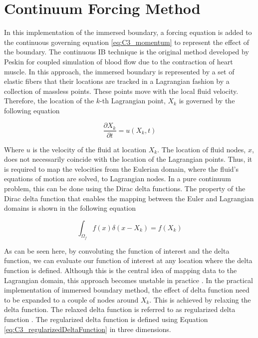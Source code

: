 \section{Continuum Forcing Method}
In this implementation of the immersed boundary, a forcing equation is added to the continuous governing equation \eqref{eq:C3_momentum} to represent the effect of the boundary. The continuous IB technique is the original method developed by Peskin \cite{peskin1972flow} for coupled simulation of blood flow due to the contraction of heart muscle. In this approach, the immersed boundary is represented by a set of elastic fibers that their locations are tracked in a Lagrangian fashion by a collection of massless points. These points move with the local fluid velocity. Therefore, the location of the $k$-th Lagrangian point, $X_k$ is governed by the following equation

\begin{equation}
    \frac{\partial X_k}{\partial t} = u(X_k, t)
\end{equation}

Where $u$ is the velocity of the fluid at location $X_k$. The location of fluid nodes, $x$, does not necessarily coincide with the location of the Lagrangian points. Thus, it is required to map the velocities from the Eulerian domain, where the fluid's equations of motion are solved, to Lagrangian nodes. In a pure continuum problem, this can be done using the Dirac delta functions. The property of the Dirac delta function that enables the mapping between the Euler and Lagrangian domains is shown in the following equation

\begin{equation}
    \int_{\Omega_f} f(x) \delta(x - X_k) = f(X_k)
\end{equation}

As can be seen here, by convoluting the function of interest and the delta function, we can evaluate our function of interest at any location where the delta function is defined. Although this is the central idea of mapping data to the Lagrangian domain, this approach becomes unstable in practice \cite{lee2003stability}. In the practical implementation of immersed boundary method, the effect of delta function need to be expanded to a couple of nodes around $X_k$. This is achieved by relaxing the delta function. The relaxed delta function is referred to as regularized delta function \cite{shin2008assessment}. The regularized delta function is defined using Equation \eqref{eq:C3_regularizedDeltaFunction} in three dimensions.

